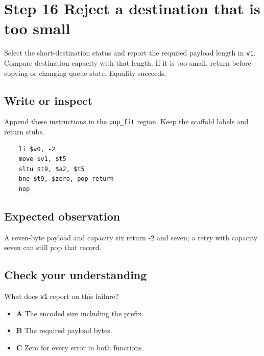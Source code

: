 \section{Step 16 Reject a destination that is too small}\label{ring-s16}

Select the short-destination status and report the required payload length in \texttt{v1}. Compare destination capacity with that length. If it is too small, return before copying or changing queue state. Equality succeeds.

\subsection{Write or inspect}
Append these instructions in the \texttt{pop\_fit} region. Keep the scaffold labels and return stubs.

\begin{verbatim}
    li $v0, -2
    move $v1, $t5
    sltu $t9, $a2, $t5
    bne $t9, $zero, pop_return
    nop
\end{verbatim}

\subsection{Expected observation}
A seven-byte payload and capacity six return -2 and seven; a retry with capacity seven can still pop that record.

\subsection{Check your understanding}
What does \texttt{v1} report on this failure?

\begin{itemize}
  \item \textbf{A} The encoded size including the prefix.
  \item \textbf{B} The required payload bytes.
  \item \textbf{C} Zero for every error in both functions.
\end{itemize}
